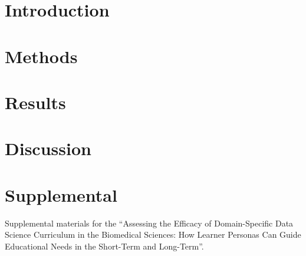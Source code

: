\documentclass[../main.tex]{subfiles}
\begin{document}
    \section{Introduction}

        

    \section{Methods}

        

    \section{Results}

        

    \section{Discussion}

        

    \section{Supplemental}

        Supplemental materials for the
        ``Assessing the Efficacy of Domain-Specific Data Science Curriculum in the Biomedical Sciences:
          How Learner Personas Can Guide Educational Needs in the Short-Term and Long-Term''.

        
        
        
\end{document}
